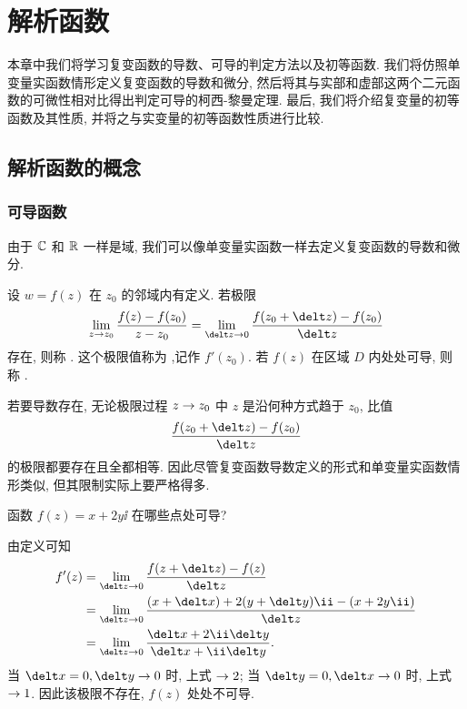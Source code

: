 \chapter{解析函数}
\label{chapter:2}

本章中我们将学习复变函数的导数、可导的判定方法以及初等函数.
我们将仿照单变量实函数情形定义复变函数的导数和微分, 然后将其与实部和虚部这两个二元函数的可微性相对比得出判定可导的柯西-黎曼定理.
最后, 我们将介绍复变量的初等函数及其性质, 并将之与实变量的初等函数性质进行比较.

\section{解析函数的概念}

\subsection{可导函数}

由于 ${\mathbb{C}}$ 和 ${\mathbb{R}}$ 一样是域, 我们可以像单变量实函数一样去定义复变函数的导数和微分.

\begin{definition}
  设 $w=f(z)$ 在 $z_0$ 的邻域内有定义.
  若极限
  \[
     \lim_{z\ra z_0}\frac{f(z)-f(z_0)}{z-z_0}
    =\lim_{\delt z\ra 0}\frac{f(z_0+\delt z)-f(z_0)}{\delt z}
  \]
  存在, 则称 .
  这个极限值称为 ,记作 $f'(z_0)$.
  若 $f(z)$ 在区域 $D$ 内处处可导, 则称 .\footnotemark
\end{definition}


  若要导数存在, 无论极限过程 $z\rightarrow z_0$ 中 $z$ 是沿何种方式趋于 $z_0$, 比值
  \[
    \frac{f(z_0+\delt z)-f(z_0)}{\delt z}
  \]
  的极限都要存在且全都相等. 
因此尽管复变函数导数定义的形式和单变量实函数情形类似, 但其限制实际上要严格得多.

\begin{example}
  函数 $f(z)=x+2y\ii$ 在哪些点处可导?
\end{example}

\begin{solution}
  由定义可知
  \begin{align*}
     f'(z)&
    =\lim_{\delt z\ra 0}\frac{f(z+\delt z)-f(z)}{\delt z}\\&
    =\lim_{\delt z\ra 0}\frac{(x+\delt x)+2(y+\delt y)\ii-(x+2y\ii)}{\delt z}\\&
    =\lim_{\delt z\ra 0}\frac{\delt x+2\ii\delt y}{\delt x+\ii\delt y}.
  \end{align*}
  当 $\delt x=0, \delt y\ra 0$ 时, 上式 $\rightarrow2$; 
  当 $\delt y=0, \delt x\ra 0$ 时, 上式 $\rightarrow1$.
  因此该极限不存在, $f(z)$ 处处不可导.
\end{solution}

